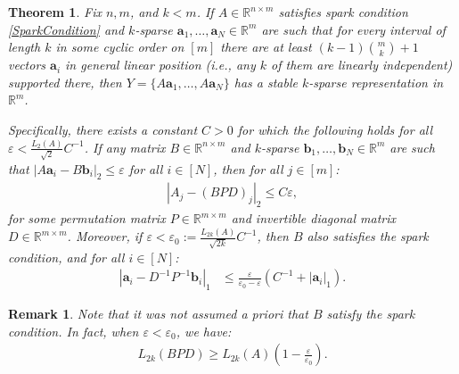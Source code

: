 \documentclass[journal, twocolumn]{IEEEtran}
\newtheorem{theorem}{Theorem}
\newtheorem{remark}{Remark}
\begin{document}
\begin{theorem}\label{DeterministicUniquenessTheorem}
Fix $n, m$, and $k < m$. If $A \in \mathbb{R}^{n \times m}$ satisfies spark condition \eqref{SparkCondition} and $k$-sparse \mbox{$\mathbf{a}_1, \ldots, \mathbf{a}_N \in \mathbb{R}^m$} are such that for every interval of length $k$ in some cyclic order on $[m]$ there are at least \mbox{$(k-1){m \choose k}+1$} vectors $\mathbf{a}_i$ in general linear position (i.e., any $k$ of them are linearly independent) supported there, then $Y = \{A\mathbf{a}_1, \ldots, A\mathbf{a}_N\}$ has a stable $k$-sparse representation in $\mathbb{R}^m$.

Specifically, there exists a constant $C > 0$ for which the following holds for all $\varepsilon < \frac{L_2(A)}{\sqrt{2}}C^{-1}$. If any matrix $B \in \mathbb{R}^{n \times m}$ and $k$-sparse $\mathbf{b}_1, \ldots, \mathbf{b}_N \in \mathbb{R}^m$ are such that \mbox{$|A\mathbf{a}_i - B\mathbf{b}_i|_2 \leq \varepsilon$} for all $i \in [N]$, then for all $j \in [m]$:
\begin{align}\label{Cstable}
|A_j-(BPD)_j|_2 \leq C\varepsilon,
\end{align}
%
for some permutation matrix $P \in \mathbb{R}^{m \times m}$ and invertible diagonal matrix $D \in \mathbb{R}^{m \times m}$.  Moreover, if $\varepsilon < \varepsilon_0 := \frac{L_{2k}(A)}{\sqrt{2k}}C^{-1}$, then $B$ also satisfies the spark condition, and for all $i \in [N]$:
\begin{align}\label{b-PDa}
|\mathbf{a}_i - D^{-1}P^{-1}\mathbf{b}_i|_1 &\leq \frac{\varepsilon }{ \varepsilon_0 - \varepsilon} \left( C^{-1}+|\mathbf{a}_i|_1 \right).
\end{align}
\end{theorem}

\begin{remark}
Note that it was not assumed a priori that $B$ satisfy the spark condition. In fact, when $\varepsilon < \varepsilon_0$, we have:
\begin{align}
L_{2k}(BPD) \geq L_{2k}(A)\left( 1 - \frac{\varepsilon}{\varepsilon_0} \right).
\end{align}
\end{remark}


\end{document}
